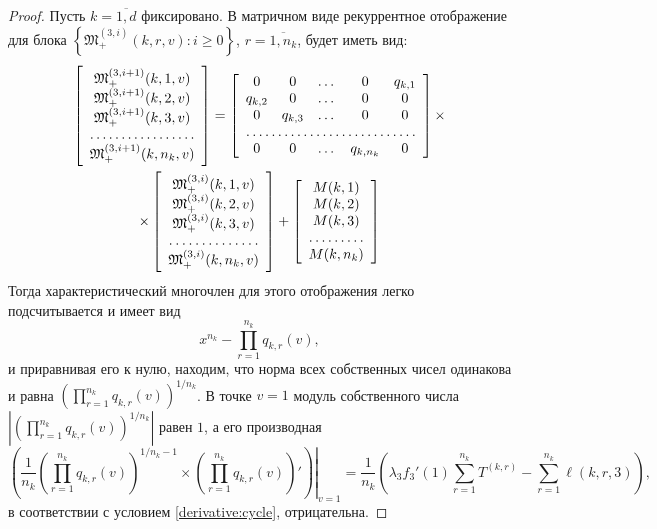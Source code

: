 \documentclass{report}
\begin{document}
\begin{proof}
Пусть $k =\overline{1,d}$ фиксировано. В матричном виде рекуррентное отображение для блока $\left\{\mathfrak{M}_+^{(3,i)}(k,r,v)\colon i \geqslant 0\right\}$, $r =\overline{1,n_k}$, будет иметь вид:
\begin{multline*}
\left[ \begin{array}{c}
    \mathfrak{M}_+^{(3,i+1)}(k,1,v) \\
    \mathfrak{M}_+^{(3,i+1)}(k,2,v) \\
    \mathfrak{M}_+^{(3,i+1)}(k,3,v) \\
    \hdotsfor{1} \\
    \mathfrak{M}_+^{(3,i+1)}(k,n_k,v)
\end{array}\right]
=
\left[ \begin{array}{c c c c c c}
    0       & 0  & \dots & 0 &   q_{k,1} \\
    q_{k,2}       & 0  & \dots & 0 & 0 \\
    0       & q_{k,3}  & \dots  &0  & 0 \\
    \hdotsfor{5} \\
    0       & 0  & \dots &  q_{k,n_k} & 0 \\
\end{array}\right]
\times \\ \times
\left[ \begin{array}{c}
    \mathfrak{M}_+^{(3,i)}(k,1,v) \\
    \mathfrak{M}_+^{(3,i)}(k,2,v) \\
    \mathfrak{M}_+^{(3,i)}(k,3,v) \\
    \hdotsfor{1} \\
    \mathfrak{M}_+^{(3,i)}(k,n_k,v)\\
\end{array}\right]
+
\left[ \begin{array}{c}
    M(k,1) \\
    M(k,2) \\
    M(k,3) \\
    \hdotsfor{1} \\
    M(k,n_k) \\
\end{array}\right]
\end{multline*}
Тогда характеристический многочлен для этого отображения легко подсчитывается и имеет вид 
$$
x^{n_k} - \prod_{r=1}^{n_k}q_{k,r} (v),
$$
и приравнивая его к нулю, находим, что норма всех собственных чисел одинакова и равна $\left(\prod_{r=1}^{n_k}q_{k,r} (v)\right)^{1/n_k}$. В точке $v=1$ модуль собственного числа $|\left(\prod_{r=1}^{n_k}q_{k,r} (v)\right)^{1/n_k}|$ равен $1$, а его производная
\begin{equation*}
\left(\frac{1}{n_k} \left.\left(\prod_{r=1}^{n_k}q_{k,r} (v)\right)^{1/n_k - 1} \times \left(\prod_{r=1}^{n_k}q_{k,r}(v)\right) '  \right)\right|_{v=1}=\frac{1}{n_k} \left(\lambda_3 f_3'(1) \sum_{r=1}^{n_k} T^{(k,r)} -\sum_{r=1}^{n_k} \ell(k,r,3)\right),
\end{equation*}
в соответствии с условием \eqref{derivative:cycle}, отрицательна.


\end{proof}
\end{document}
